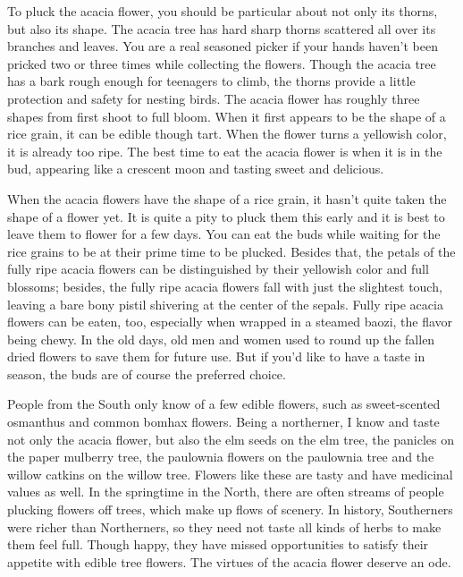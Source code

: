 { 	To pluck the acacia flower, you should be particular about not only its thorns, but also its shape. The acacia tree has hard sharp thorns scattered all over its branches and leaves. You are a real seasoned picker if your hands haven’t been pricked two or three times while collecting the flowers. Though the acacia tree has a bark rough enough for teenagers to climb, the thorns provide a little protection and safety for nesting birds. The acacia flower has roughly three shapes from first shoot to full bloom. When it first appears to be the shape of a rice grain, it can be edible though tart. When the flower turns a yellowish color, it is already too ripe. The best time to eat the acacia flower is when it is in the bud, appearing like a crescent moon and tasting sweet and delicious.
 	
 	When the acacia flowers have the shape of a rice grain, it hasn’t quite taken the shape of a flower yet. It is quite a pity to pluck them this early and it is best to leave them to flower for a few days. You can eat the buds while waiting for the rice grains to be at their prime time to be plucked. Besides that, the petals of the fully ripe acacia flowers can be distinguished by their yellowish color and full blossoms; besides, the fully ripe acacia flowers fall with just the slightest touch, leaving a bare bony pistil shivering at the center of the sepals. Fully ripe acacia flowers can be eaten, too, especially when wrapped in a steamed baozi, the flavor being chewy. In the old days, old men and women used to round up the fallen dried flowers to save them for future use. But if you’d like to have a taste in season, the buds are of course the preferred choice.
 	
 	People from the South only know of a few edible flowers, such as sweet-scented osmanthus and common bomhax flowers. Being a northerner, I know and taste not only the acacia flower, but also the elm seeds on the elm tree, the panicles on the paper mulberry tree, the paulownia flowers on the paulownia tree and the willow catkins on the willow tree. Flowers like these are tasty and have medicinal values as well. In the springtime in the North, there are often streams of people plucking flowers off trees, which make up flows of scenery. In history, Southerners were richer than Northerners, so they need not taste all kinds of herbs to make them feel full. Though happy, they have missed opportunities to satisfy their appetite with edible tree flowers. The virtues of the acacia flower deserve an ode.
 }